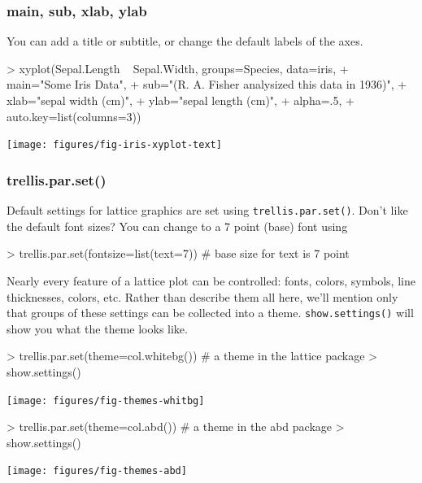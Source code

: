 \vspace{-8mm}
\subsubsection*{main, sub, xlab, ylab}

You can add a title or subtitle, or change the default labels of the axes.
\begin{center}
\begin{Schunk}
\begin{Sinput}
> xyplot(Sepal.Length ~ Sepal.Width, groups=Species, data=iris, 
+ 	main="Some Iris Data",
+ 	sub="(R. A. Fisher analysized this data in 1936)",
+ 	xlab="sepal width (cm)",
+ 	ylab="sepal length (cm)",
+ 	alpha=.5,        
+ 	auto.key=list(columns=3))   
\end{Sinput}
\end{Schunk}
\texttt{[image: figures/fig-iris-xyplot-text]}
\end{center}

\subsubsection{trellis.par.set()}
Default settings for lattice graphics are set using 
\verb!trellis.par.set()!.
Don't like the default font sizes?  You can change to a 7 point (base) font using

\begin{Schunk}
\begin{Sinput}
> trellis.par.set(fontsize=list(text=7))    # base size for text is 7 point 
\end{Sinput}
\end{Schunk}


Nearly every feature of a lattice plot can be controlled: fonts, colors,
symbols, line thicknesses, colors, etc.
Rather than describe them all here, we'll mention only that groups of these settings 
can be collected into a theme.  \verb!show.settings()! will show you what the theme looks like.

\begin{Schunk}
\begin{Sinput}
> trellis.par.set(theme=col.whitebg())      # a theme in the lattice package
> show.settings()
\end{Sinput}
\end{Schunk}
\texttt{[image: figures/fig-themes-whitbg]}

\begin{Schunk}
\begin{Sinput}
> trellis.par.set(theme=col.abd())          # a theme in the abd package
> show.settings()
\end{Sinput}
\end{Schunk}
\texttt{[image: figures/fig-themes-abd]}

